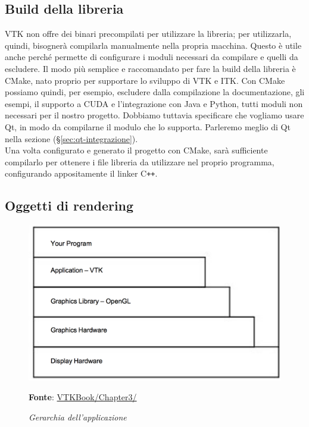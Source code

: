 \subsection{Build della libreria}\label{sec:build-liberia}
VTK non offre dei binari precompilati per utilizzare la libreria; per utilizzarla, quindi, bisognerà compilarla manualmente nella propria macchina. Questo è utile anche perché permette di configurare i moduli necessari da compilare e quelli da escludere. Il modo più semplice e raccomandato per fare la build della libreria è CMake, nato proprio per supportare lo sviluppo di VTK e ITK. Con CMake possiamo quindi, per esempio, escludere dalla compilazione la documentazione, gli esempi, il supporto a CUDA e l'integrazione con Java e Python, tutti moduli non necessari per il nostro progetto. Dobbiamo tuttavia specificare che vogliamo usare Qt, in modo da compilarne il modulo che lo supporta. Parleremo meglio di Qt nella sezione  (§\ref{sec:qt-integrazione}).\\
Una volta configurato e generato il progetto con CMake, sarà sufficiente compilarlo per ottenere i file libreria da utilizzare nel proprio programma, configurando appositamente il linker C\texttt{++}.

\subsection{Oggetti di rendering}\label{sec:oggetti-rendering}
\begin{figure}[h]
    \centering
    \includegraphics[scale=0.4]{immagini/volumerendering/layers.png}
    \caption{\textit{Gerarchia dell'applicazione}}
    \textbf{Fonte}: \href{https://lorensen.github.io/VTKExamples/site/VTKBook/03Chapter3/}{VTKBook/Chapter3/}
    \label{fig: vtk-layers}
\end{figure}

